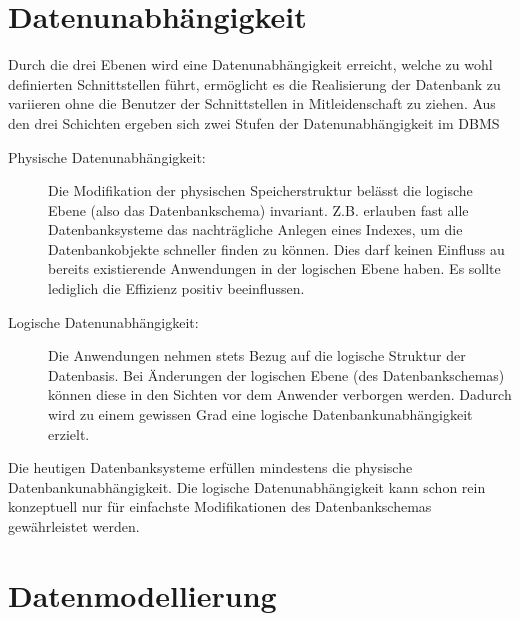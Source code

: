 \section{Datenunabhängigkeit}
Durch die drei Ebenen wird eine Datenunabhängigkeit erreicht, welche zu wohl definierten Schnittstellen führt, ermöglicht es die Realisierung der Datenbank zu variieren ohne die Benutzer der Schnittstellen in Mitleidenschaft zu ziehen. Aus den drei Schichten ergeben sich zwei Stufen der Datenunabhängigkeit im DBMS
\begin{description}
\item[Physische Datenunabhängigkeit:] Die Modifikation der physischen Speicherstruktur belässt die logische Ebene (also das Datenbankschema) invariant. Z.B. erlauben fast alle Datenbanksysteme das nachträgliche Anlegen eines Indexes, um die Datenbankobjekte schneller finden zu können. Dies darf keinen Einfluss au bereits existierende Anwendungen in der logischen Ebene haben. Es sollte lediglich die Effizienz positiv beeinflussen.
\item[Logische Datenunabhängigkeit:] Die Anwendungen nehmen stets Bezug auf die logische Struktur der Datenbasis. Bei Änderungen der logischen Ebene (des Datenbankschemas) können diese in den Sichten vor dem Anwender verborgen werden. Dadurch wird zu einem gewissen Grad eine logische Datenbankunabhängigkeit erzielt. 
\end{description}
Die heutigen Datenbanksysteme erfüllen mindestens die physische Datenbankunabhängigkeit. Die logische Datenunabhängigkeit kann schon rein konzeptuell nur für einfachste Modifikationen des Datenbankschemas gewährleistet werden. 
\section{Datenmodellierung}